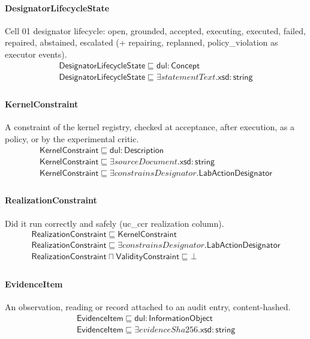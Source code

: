 \documentclass[10pt]{article}
\begin{document}
\paragraph{DesignatorLifecycleState} Cell 01 designator lifecycle: open, grounded, accepted, executing, executed, failed, repaired, abstained, escalated (+ repairing, replanned, policy\_violation as executor events).
\[\begin{array}{l}
\mathsf{DesignatorLifecycleState} \sqsubseteq  \mathsf{dul{:}Concept} \\
\mathsf{DesignatorLifecycleState} \sqsubseteq  \exists \mathit{statementText}.\mathsf{xsd{:}string} \\
\end{array}\]
\paragraph{KernelConstraint} A constraint of the kernel registry, checked at acceptance, after execution, as a policy, or by the experimental critic.
\[\begin{array}{l}
\mathsf{KernelConstraint} \sqsubseteq  \mathsf{dul{:}Description} \\
\mathsf{KernelConstraint} \sqsubseteq  \exists \mathit{sourceDocument}.\mathsf{xsd{:}string} \\
\mathsf{KernelConstraint} \sqsubseteq  \exists \mathit{constrainsDesignator}.\mathsf{LabActionDesignator} \\
\end{array}\]
\paragraph{RealizationConstraint} Did it run correctly and safely (uc\_ccr realization column).
\[\begin{array}{l}
\mathsf{RealizationConstraint} \sqsubseteq  \mathsf{KernelConstraint} \\
\mathsf{RealizationConstraint} \sqsubseteq  \exists \mathit{constrainsDesignator}.\mathsf{LabActionDesignator} \\
\mathsf{RealizationConstraint} \sqcap  \mathsf{ValidityConstraint} \sqsubseteq  \bot  \\
\end{array}\]
\paragraph{EvidenceItem} An observation, reading or record attached to an audit entry, content-hashed.
\[\begin{array}{l}
\mathsf{EvidenceItem} \sqsubseteq  \mathsf{dul{:}InformationObject} \\
\mathsf{EvidenceItem} \sqsubseteq  \exists \mathit{evidenceSha256}.\mathsf{xsd{:}string} \\
\end{array}\]
\end{document}
